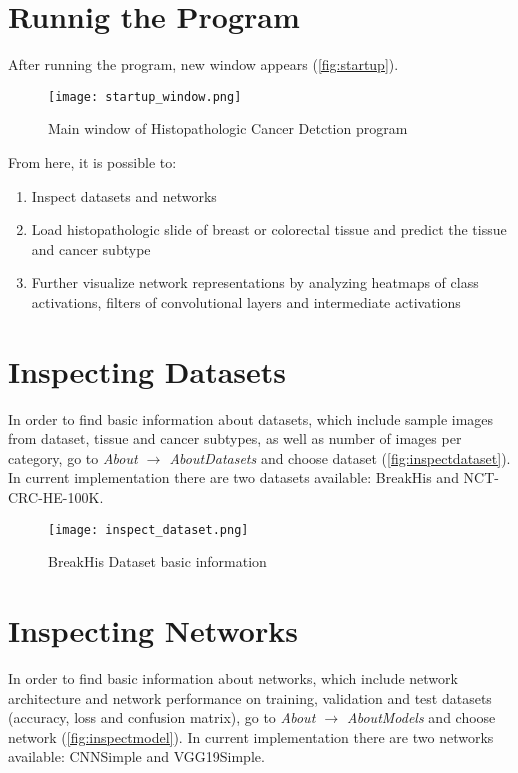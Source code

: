 \section{Runnig the Program}

After running the program, new window appears (\textcolor{red}{\autoref{fig:startup}}).

\begin{figure}[h]
	\centering
	\texttt{[image: startup\_window.png]}
	\caption{Main window of Histopathologic Cancer Detction program}
	\label{fig:startup}
\end{figure}

From here, it is possible to:
\begin{enumerate}
	\itemsep 0em
	\item Inspect datasets and networks
	\item Load histopathologic slide of breast or colorectal tissue and predict the tissue and cancer subtype
	\item Further visualize network representations by analyzing heatmaps of class activations, filters of convolutional layers and intermediate activations
\end{enumerate}

\section{Inspecting Datasets}

In order to find basic information about datasets, which include sample images from dataset, tissue and cancer subtypes, as well as number of images per category, go to \emph{About $\rightarrow$ About\;Datasets} and choose dataset (\textcolor{red}{\autoref{fig:inspectdataset}}). In current implementation there are two datasets available: BreakHis and NCT-CRC-HE-100K.
\clearpage

\begin{figure}[h]
	\centering
	\texttt{[image: inspect\_dataset.png]}
	\caption{BreakHis Dataset basic information}
	\label{fig:inspectdataset}
\end{figure}

\section{Inspecting Networks}

In order to find basic information about networks, which include network architecture and network performance on training, validation and test datasets (accuracy, loss and confusion matrix), go to \emph{About $\rightarrow$ About\;Models} and choose network (\textcolor{red}{\autoref{fig:inspectmodel}}). In current implementation there are two networks available: CNNSimple and VGG19Simple.

